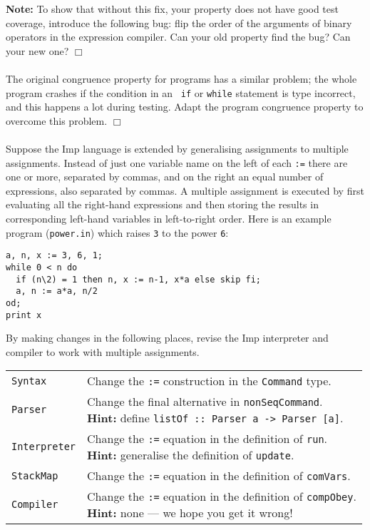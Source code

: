 {\bf Note:} To show that without this fix, your property does not have good test
coverage, introduce the following bug: flip the order of the arguments of
binary operators in the expression compiler. Can your old property find the
bug? Can your new one?
\hfill$\Box$

\paragraph{\nextex}
The original congruence property for programs
has a similar problem; the whole program crashes if the condition in an {\tt
if} or {\tt while} statement is type incorrect, and this happens a lot during
testing. Adapt the program congruence property to overcome this problem.
\hfill$\Box$

\paragraph{\nextex}
Suppose the Imp language is extended by generalising assignments to
multiple assignments.  Instead of just one variable name on the left of
each {\tt :=} there are one or more, separated by commas, and on the right
an equal number of expressions, also separated by commas.
A multiple assignment is executed by first evaluating all the right-hand
expressions and then storing the results in corresponding left-hand
variables in left-to-right order.
Here is an example program ({\tt power.in}) which raises {\tt 3} to the
power {\tt 6}:
\begin{verbatim}
a, n, x := 3, 6, 1;
while 0 < n do
  if (n\2) = 1 then n, x := n-1, x*a else skip fi;
  a, n := a*a, n/2
od;
print x
\end{verbatim}
By making changes in the following places,
revise the Imp interpreter and compiler to work with
multiple assignments.
\begin{center}
\renewcommand{\arraystretch}{2.0}
\begin{tabular}{ll}
{\tt Syntax}   &
  \parbox[t]{3.5in}{Change the {\tt :=} construction in the {\tt Command} type.} \\
{\tt Parser}   &
  \parbox[t]{3.5in}{Change the final alternative in {\tt nonSeqCommand}. \\
     {\bf Hint:} define
     {\tt listOf :: Parser a -> Parser [a]}. } \\
{\tt Interpreter} & 
  \parbox[t]{3.5in}{Change the {\tt :=} equation in
                    the definition of {\tt run}. \\
     {\bf Hint:} generalise the definition of {\tt update}.} \\
{\tt StackMap} &
  \parbox[t]{3.5in}{Change the {\tt :=} equation in
                    the definition of {\tt comVars}.} \\
{\tt Compiler} &
  \parbox[t]{3.5in}{Change the {\tt :=} equation in the
                    definition of {\tt compObey}. \\
          {\bf Hint:} none --- we hope you get it wrong!}
\end{tabular}
\renewcommand{\arraystretch}{1.0}
\end{center}
